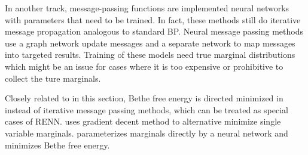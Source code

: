 In another track, message-passing functions are implemented neural networks with parameters that need to be trained. In fact, these methods still do iterative message propagation analogous to standard BP.
Neural message passing methods \cite{yoon2019inferenceGraph, pmlr-v70-gilmer17a} use a  graph network update messages and a separate network to map messages into targeted results. Training of these models need true marginal distributions which might be an issue for cases where it is too expensive or prohibitive to collect the ture marginals.

Closely related to in this section, Bethe free energy is directed minimized in \cite{welling2001belief,NIPS2019_9687} instead of iterative message passing methods, which can be treated as special cases of RENN. \cite{welling2001belief} uses gradient decent method to alternative minimize single variable marginals. \cite{NIPS2019_9687} parameterizes marginals directly by a neural network and minimizes Bethe free energy.


